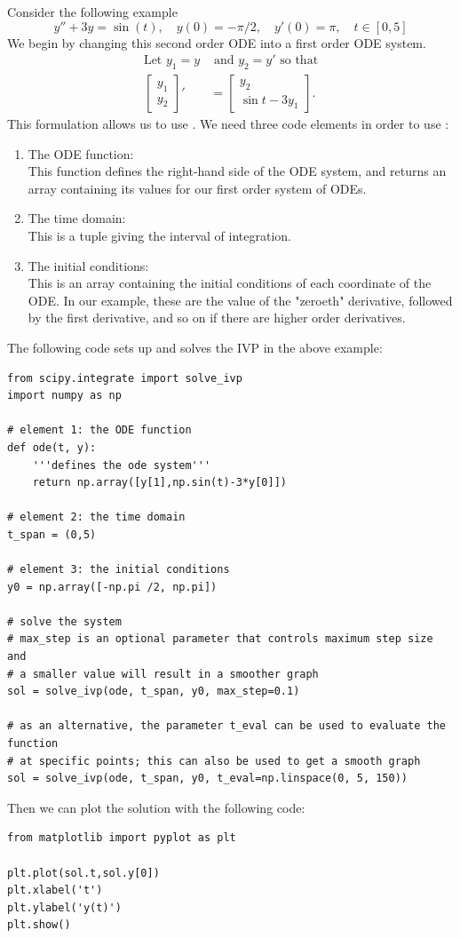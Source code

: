 Consider the following example
\begin{equation*}
    y''+3y = \sin(t), \quad
    y(0) = -\pi /2, \quad
    y'(0) = \pi, \quad
    t \in [0,5]
\end{equation*}
We begin by changing this second order ODE into a first order ODE system.
\begin{align*}
    \text{Let } y_1 = y &\text{ and } y_2 = y' \text{ so that}\\
    \begin{bmatrix}
        y_1\\y_2
    \end{bmatrix}'
    &=
    \begin{bmatrix}
        y_2 \\
        \sin{t} - 3y_1
    \end{bmatrix}.
\end{align*}
This formulation allows us to use .
We need three code elements in order to use :
\begin{enumerate}
    \item The ODE function: \\
    This function defines the right-hand side of the ODE system, and returns an array containing its values for our first order system of ODEs.
    \item The time domain: \\
    This is a tuple giving the interval of integration. 
    \item The initial conditions: \\
    This is an array containing the initial conditions of each coordinate of the ODE.
    In our example, these are the value of the "zeroeth" derivative, followed by the first derivative, and so on if there are higher order derivatives. 
\end{enumerate}
The following code sets up and solves the IVP in the above example:
\begin{lstlisting}
from scipy.integrate import solve_ivp
import numpy as np

# element 1: the ODE function
def ode(t, y):
    '''defines the ode system'''
    return np.array([y[1],np.sin(t)-3*y[0]])
    
# element 2: the time domain
t_span = (0,5)

# element 3: the initial conditions
y0 = np.array([-np.pi /2, np.pi])

# solve the system
# max_step is an optional parameter that controls maximum step size and 
# a smaller value will result in a smoother graph
sol = solve_ivp(ode, t_span, y0, max_step=0.1)

# as an alternative, the parameter t_eval can be used to evaluate the function
# at specific points; this can also be used to get a smooth graph
sol = solve_ivp(ode, t_span, y0, t_eval=np.linspace(0, 5, 150))
\end{lstlisting}
Then we can plot the solution with the following code:
\begin{lstlisting}
from matplotlib import pyplot as plt

plt.plot(sol.t,sol.y[0])
plt.xlabel('t')
plt.ylabel('y(t)')
plt.show()
\end{lstlisting}

